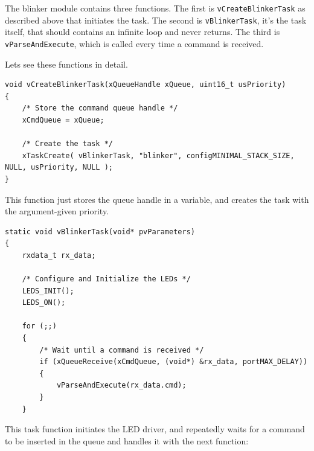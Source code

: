\documentclass[11pt]{report}
\begin{document}
The blinker module contains three functions. The first is \verb$vCreateBlinkerTask$ as described above that initiates the task. The second is \verb$vBlinkerTask$, it's the task itself, that should contains an infinite loop and never returns. The third is \verb$vParseAndExecute$, which is called every time a command is received.

Lets see these functions in detail.

\begin{verbatim}
void vCreateBlinkerTask(xQueueHandle xQueue, uint16_t usPriority)
{
    /* Store the command queue handle */
    xCmdQueue = xQueue;

    /* Create the task */
    xTaskCreate( vBlinkerTask, "blinker", configMINIMAL_STACK_SIZE, NULL, usPriority, NULL );
}
\end{verbatim}
This function just stores the queue handle in a variable, and creates the task with the argument-given priority.

\begin{verbatim}
static void vBlinkerTask(void* pvParameters)
{
    rxdata_t rx_data;

    /* Configure and Initialize the LEDs */
    LEDS_INIT();
    LEDS_ON();

    for (;;)
    {
        /* Wait until a command is received */
        if (xQueueReceive(xCmdQueue, (void*) &rx_data, portMAX_DELAY))
        {
            vParseAndExecute(rx_data.cmd);
        }
    }
\end{verbatim}

This task function initiates the LED driver, and repeatedly waits for a command to be inserted in the queue and handles it with the next function:
\end{document}
